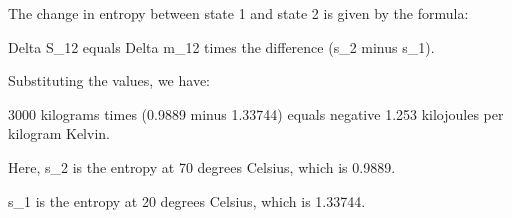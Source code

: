 The change in entropy between state 1 and state 2 is given by the formula:

Delta S_12 equals Delta m_12 times the difference (s_2 minus s_1).

Substituting the values, we have:

3000 kilograms times (0.9889 minus 1.33744) equals negative 1.253 kilojoules per kilogram Kelvin.

Here, s_2 is the entropy at 70 degrees Celsius, which is 0.9889.

s_1 is the entropy at 20 degrees Celsius, which is 1.33744.